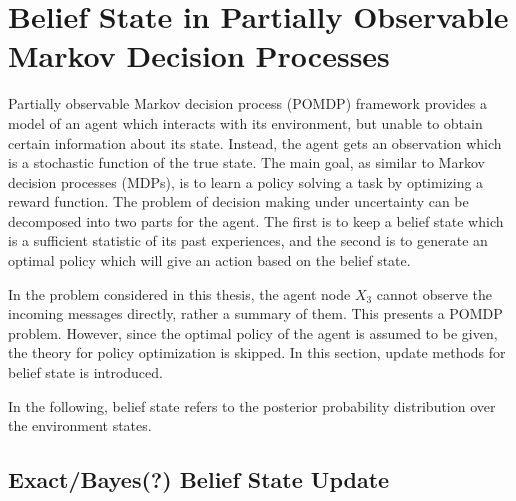 
\section{Belief State in Partially Observable Markov Decision Processes}
Partially observable Markov decision process (POMDP) framework provides a model of an agent which interacts with its environment, but unable to obtain certain information about its state. Instead, the agent gets an observation which is a stochastic function of the true state. The main goal, as similar to Markov decision processes (MDPs), is to learn a policy solving a task by optimizing a reward function. The problem of decision making under uncertainty can be decomposed into two parts for the agent. The first is to keep a belief state which is a sufficient statistic of its past experiences, and the second is to generate an optimal policy which will give an action based on the belief state. \cite{Murphy2000,Kaelbling2011}

In the problem considered in this thesis, the agent node $ X_{3} $ cannot observe the incoming messages directly, rather a summary of them. This presents a POMDP problem. However, since the optimal policy of the agent is assumed to be given, the theory for policy optimization is skipped. In this section, update methods for belief state is introduced.

In the following, belief state refers to the posterior probability distribution over the environment states.

\subsection{Exact/Bayes(?) Belief State Update}

